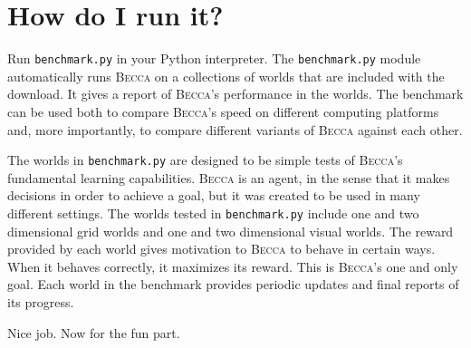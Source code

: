 \section{How do I run it?}

Run \texttt{benchmark.py} in your Python interpreter. The \texttt{benchmark.py} module automatically runs \textsc{Becca} on a collections of worlds that are included with the download. It gives a report of \textsc{Becca}'s performance in the worlds. The benchmark can be used both to compare \textsc{Becca}'s speed on different computing platforms and, more importantly, to compare different variants of \textsc{Becca} against each other.

The worlds in \texttt{benchmark.py} are designed to be simple tests of \textsc{Becca}'s fundamental learning capabilities. \textsc{Becca} is an agent, in the sense that it makes decisions in order to achieve a goal, but it was created to be used in many different settings. The worlds tested in \texttt{benchmark.py} include one and two dimensional grid worlds and one and two dimensional visual worlds. The reward provided by each world gives motivation to \textsc{Becca} to behave in certain ways. When it behaves correctly, it maximizes its reward. This is \textsc{Becca}'s one and only goal. Each world in the benchmark provides periodic updates and final reports of its progress. 

Nice job. Now for the fun part.